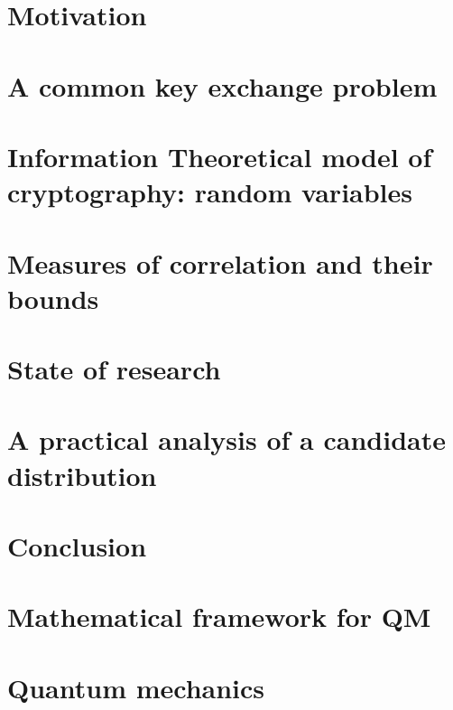 \documentclass[titlepage]{report}
\theoremstyle{remark}
\begin{document}

\tableofcontents

%

\chapter{Motivation}

		
\chapter{A common key exchange problem}

\chapter{Information Theoretical model of cryptography: random variables}

\chapter{Measures of correlation and their bounds}

\chapter{State of research}

\chapter{A practical analysis of a candidate distribution}

\chapter{Conclusion}


\begin{appendices}
	\chapter{Mathematical framework for QM}
	
	\chapter{Quantum mechanics}
	
\end{appendices}

%
\printbibliography
\end{document}
